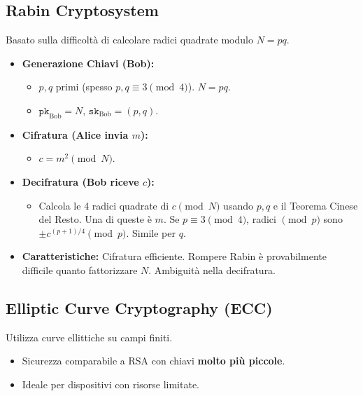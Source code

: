 \subsection{Rabin Cryptosystem}
Basato sulla difficoltà di calcolare radici quadrate modulo $N=pq$.
\begin{itemize}
    \item \textbf{Generazione Chiavi (Bob):}
    \begin{itemize}
        \item $p, q$ primi (spesso $p, q \equiv 3 \pmod 4$). $N = pq$.
        \item $\texttt{pk}_{\text{Bob}} = N$, $\texttt{sk}_{\text{Bob}} = (p, q)$.
    \end{itemize}
    \item \textbf{Cifratura (Alice invia $m$):}
    \begin{itemize}
        \item $c = m^2 \pmod N$.
    \end{itemize}
    \item \textbf{Decifratura (Bob riceve $c$):}
    \begin{itemize}
        \item Calcola le 4 radici quadrate di $c \pmod N$ usando $p,q$ e il Teorema Cinese del Resto. Una di queste è $m$.
        Se $p \equiv 3 \pmod 4$, radici $\pmod p$ sono $\pm c^{(p+1)/4} \pmod p$. Simile per $q$.
    \end{itemize}
    \item \textbf{Caratteristiche:} Cifratura efficiente. Rompere Rabin è provabilmente difficile quanto fattorizzare $N$. Ambiguità nella decifratura.
\end{itemize}

\subsection{Elliptic Curve Cryptography (ECC)}
Utilizza curve ellittiche su campi finiti.
\begin{itemize}
    \item Sicurezza comparabile a RSA con chiavi \textbf{molto più piccole}.
    \item Ideale per dispositivi con risorse limitate.
\end{itemize}

